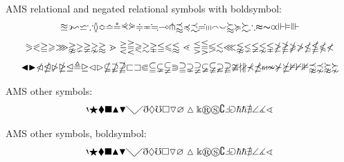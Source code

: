 \documentclass[12pt,a4paper]{article}
\theoremstyle{clearprint}
\begin{document}
\noindent
AMS relational and negated relational symbols with boldsymbol:
\begin{equation}
\boldsymbol{\approxeq \backepsilon \backsim \backsimeq \because \between \Bumpeq \bumpeq \circeq \curlyeqprec \curlyeqsucc \doteqdot \eqcirc \fallingdotseq \multimap \pitchfork \precapprox \preccurlyeq \precsim \risingdotseq \shortmid \shortparallel \smallfrown \smallsmile \succapprox \succcurlyeq \succsim \therefore \thickapprox \thicksim \varpropto \Vdash \vDash \Vvdash}
\end{equation}
\begin{equation}
\boldsymbol{\eqslantgtr \eqslantless \geqq \geqslant \ggg \gnapprox \gneq \gneqq \gnsim \gtrapprox \gtrdot \gtreqless \gtreqqless \gtrless \gtrsim \gvertneqq \leqq \leqslant \lessapprox \lessdot \lesseqgtr \lesseqqgtr \lessgtr \lesssim \lll \lnapprox \lneq \lneqq \lnsim \lvertneqq \ngeq \ngeqq \ngeqslant \ngtr \nleq \nleqq \nleqslant \nless}
\end{equation}
\begin{equation}
\boldsymbol{\blacktriangleleft \blacktriangleright \ntriangleleft \ntrianglelefteq \ntriangleright \ntrianglerighteq \trianglelefteq \triangleq \trianglerighteq \vartriangleleft \vartriangleright
\nsubseteq \nsupseteq \nsupseteqq \sqsubset \sqsupset \Subset \subseteqq \subsetneq \subsetneqq \Supset \supseteqq \supsetneq \supsetneqq \varsubsetneq \varsubsetneqq \varsupsetneq \varsupsetneqq
\ncong \nmid \nparallel \nprec \npreceq \nshortmid \nshortparallel \nsim \nsucc \nsucceq \nvDash \nvdash \nVDash \precnapprox \precnsim \succnapprox \succnsim}
\end{equation}

\noindent
AMS other symbols: %
\begin{equation}
\backprime \bigstar \blacklozenge \blacksquare \blacktriangle \blacktriangledown \diagdown \diagup \eth \lozenge \mho \square \triangledown \varnothing \vartriangle
\Bbbk \circledR \circledS \complement \Finv \Game \hbar \hslash \nexists
\angle \measuredangle \sphericalangle 
\end{equation}

\noindent
AMS other symbols, boldsymbol:
\begin{equation}
\boldsymbol{\backprime \bigstar \blacklozenge \blacksquare \blacktriangle \blacktriangledown \diagdown \diagup \eth \lozenge \mho \square \triangledown \varnothing \vartriangle
\Bbbk \circledR \circledS \complement \Finv \Game \hbar \hslash \nexists
\angle \measuredangle \sphericalangle}
\end{equation}
\end{document}
